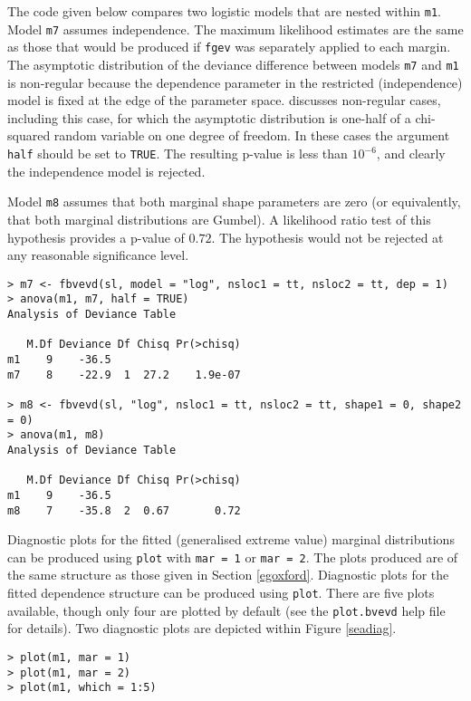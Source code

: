 \documentclass[11pt,a4paper]{article}
\begin{document}
The code given below compares two logistic models that are nested within \verb+m1+. Model \verb+m7+ assumes independence.
The maximum likelihood estimates are the same as those that would be produced if \verb+fgev+ was separately applied to each margin.
The asymptotic distribution of the deviance difference between models \verb+m7+ and \verb+m1+ is non-regular because the dependence parameter in the restricted (independence) model is fixed at the edge of the parameter space.
\cite{tawn88} discusses non-regular cases, including this case, for which the asymptotic distribution is one-half of a chi-squared random variable on one degree of freedom.
In these cases the argument \verb+half+ should be set to \verb+TRUE+.
The resulting p-value is less than $10^{-6}$, and clearly the independence model is rejected.

Model \verb+m8+ assumes that both marginal shape parameters are zero (or equivalently, that both marginal distributions are Gumbel).
A likelihood ratio test of this hypothesis provides a p-value of $0.72$.
The hypothesis would not be rejected at any reasonable significance level.   

\begin{verbatim}
> m7 <- fbvevd(sl, model = "log", nsloc1 = tt, nsloc2 = tt, dep = 1)
> anova(m1, m7, half = TRUE)
Analysis of Deviance Table

   M.Df Deviance Df Chisq Pr(>chisq)
m1    9    -36.5                    
m7    8    -22.9  1  27.2    1.9e-07

> m8 <- fbvevd(sl, "log", nsloc1 = tt, nsloc2 = tt, shape1 = 0, shape2 = 0)
> anova(m1, m8)
Analysis of Deviance Table

   M.Df Deviance Df Chisq Pr(>chisq)
m1    9    -36.5
m8    7    -35.8  2  0.67       0.72
\end{verbatim}

Diagnostic plots for the fitted (generalised extreme value) marginal distributions can be produced using \verb+plot+ with \verb+mar = 1+ or \verb+mar = 2+.
The plots produced are of the same structure as those given in Section \ref{egoxford}.
Diagnostic plots for the fitted dependence structure can be produced using \verb+plot+. There are five plots available, though only four are plotted by default (see the \verb+plot.bvevd+ help file for details). Two diagnostic plots are depicted within Figure \ref{seadiag}.

\begin{verbatim}
> plot(m1, mar = 1)
> plot(m1, mar = 2)
> plot(m1, which = 1:5)
\end{verbatim}
\end{document}
